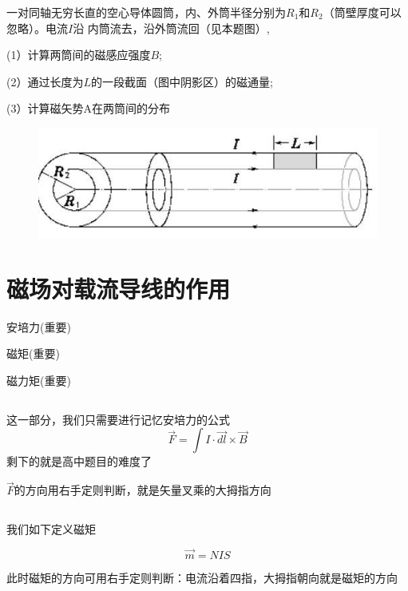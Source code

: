 \documentclass[lang=cn,10pt]{elegantbook}
\begin{document}
		\begin{example}
			一对同轴无穷长直的空心导体圆筒，内、外筒半径分别为$R_{1}$和$R_{2}$（筒壁厚度可以忽略）。电流$I$沿
			内筒流去，沿外筒流回（见本题图）,
			
			(1）计算两筒间的磁感应强度$B$;
			
			(2）通过长度为$L$的一段截面（图中阴影区）的磁通量;
			
			(3）计算磁矢势A在两筒间的分布
			
			
\begin{figure}[H]
	\centering
	\includegraphics[width=0.18\linewidth]{image/1700629154615}
	\caption{}
	\label{fig:1700629154615}
\end{figure}
		\end{example}
	\section{磁场对载流导线的作用}
	\begin{introduction}
		\item 安培力(重要)
		\item 磁矩(重要)
		\item 磁力矩(重要)
	\end{introduction}
	\subsection{\color{red}}
	这一部分，我们只需要进行记忆安培力的公式
	\begin{equation*}
		\overrightarrow{F}=\int{I\cdot \overrightarrow{dl}\times \overrightarrow{B}}
	\end{equation*}
	剩下的就是高中题目的难度了
	
	\begin{remark}
		$	\overrightarrow{F}$的方向用右手定则判断，就是矢量叉乘的大拇指方向
	\end{remark}
	\subsection{\color{red}}
	我们如下定义磁矩
	\begin{definition}[磁矩]
		\begin{equation*}
			\overrightarrow{m}=NIS
		\end{equation*}		
	\end{definition}
	\begin{remark}
		此时磁矩的方向可用右手定则判断：电流沿着四指，大拇指朝向就是磁矩的方向
	\end{remark}
\end{document}
